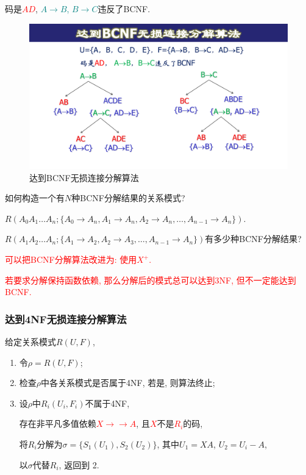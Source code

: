 码是\textcolor{red}{$AD$}, \textcolor{teal}{$A\to B$, $B\to C$}违反了BCNF.

\begin{figure}[H]
    \centering
    \includegraphics[width=.8\textwidth]{./figure/BCNF无损分解.pdf}
    \caption{达到BCNF无损连接分解算法}
\end{figure}

\begin{example}
  如何构造一个有$N$种BCNF分解结果的关系模式?
\end{example}

$R(A_0A_1\dots A_n; \{A_0\to A_n, A_1\to A_n, A_2\to A_n, \dots, A_{n-1}\to A_n\})$.

\begin{example}
  $R(A_1A_2\dots A_n; \{A_1\to A_2, A_2\to A_3, \dots, A_{n-1}\to A_n\})$有多少种BCNF分解结果?
\end{example}

\textcolor{red}{可以把BCNF分解算法改进为: 使用$X^+$.}

\textcolor{red}{若要求分解保持函数依赖, 那么分解后的模式总可以达到3NF, 但不一定能达到BCNF.}

\subsubsection{达到4NF无损连接分解算法}

给定关系模式$R(U,F)$,
\begin{enumerate}
    \item 令$\rho = R(U,F)$;
    \item 检查$\rho$中各关系模式是否属于4NF, 若是, 则算法终止;
    \item 设$\rho$中$R_i(U_i,F_i)$不属于4NF,

        存在非平凡多值依赖\textcolor{red}{$X \rightarrow \rightarrow A$}, 且\textcolor{red}{$X$}不是\textcolor{red}{$R_i$}的码,

        将$R_i$分解为$\sigma = \{S_1(U_1), S_2(U_2)\}$,
        其中$U_1 = XA$, $U_2 = U_i - A$,

        以$\sigma$代替$R_i$, 返回到 2.
\end{enumerate}

